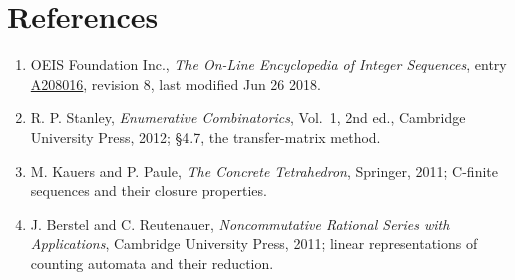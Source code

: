 \documentclass[11pt]{article}
\theoremstyle{definition}
\begin{document}
\section{References}

\begin{enumerate}

\item OEIS Foundation Inc., \emph{The On-Line Encyclopedia of Integer Sequences}, entry \href{https://oeis.org/A208016}{A208016}, revision 8, last modified Jun 26 2018.

\item R. P. Stanley, \emph{Enumerative Combinatorics}, Vol.~1, 2nd ed., Cambridge University Press, 2012; \S4.7, the transfer-matrix method.

\item M. Kauers and P. Paule, \emph{The Concrete Tetrahedron}, Springer, 2011; C-finite sequences and their closure properties.

\item J. Berstel and C. Reutenauer, \emph{Noncommutative Rational Series with Applications}, Cambridge University Press, 2011; linear representations of counting automata and their reduction.

\end{enumerate}
\end{document}
